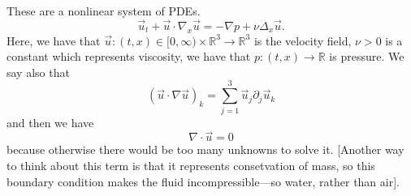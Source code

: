 \begin{example}
	These are a nonlinear system of PDEs.
	\[ \vec u_{t} + \vec u \cdot \nabla_{x} \vec u = - \nabla p + \nu \Delta_{x} \vec u. \]
	Here, we have that \( \vec u : (t, x) \in [0, \infty) \times \mathbb{R}^{3} \to \mathbb{R}^{3} \) is the velocity field, \( \nu > 0 \) is a constant which represents viscosity, we have that \( p : (t, x) \to \mathbb{R} \) is pressure.
	We say also that
	\[ (\vec u \cdot \nabla \vec u)_{k} = \sum_{j=1}^{3}  \vec u_{j} \partial_{j} \vec u_{k} \]
	and then we have
	\[ \nabla \cdot \vec u = 0 \]
	because otherwise there would be too many unknowns to solve it. [Another way to think about this term is that it represents consetvation of mass, so this boundary condition makes the fluid incompressible---so water, rather than air].
\end{example}
